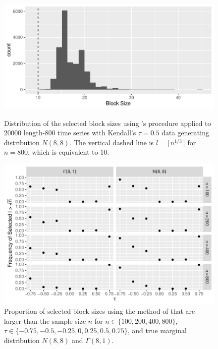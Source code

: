 \documentclass[12pt]{article}
\begin{document}
\begin{figure}[tbp]
  \centering
  \includegraphics[scale=1]{figures/block_dist}
  \caption{Distribution of the selected block sizes using
  \citet{politis2004automatic}'s procedure applied to 20000 length-800 time 
  series with
    Kendall's $\tau = 0.5$ data generating distribution $N(8,8)$. The vertical
    dashed line is $l = \lceil n^{1/3} \rceil$ for $n = 800$, which is equivalent 
    to 10.
  }
  \label{fig:block_dist}


  \centering
  \includegraphics[scale=1]{figures/large_block}
  \caption{Proportion of selected block sizes using the method of
  \citet{politis2004automatic} that are larger than the sample size
    $n$ for $n \in \{100, 200, 400, 800\}$,
    $\tau \in \{-0.75, -0.5, -0.25, 0, 0.25, 0.5, 0.75\}$, and true marginal distribution
    $N(8,8)$ and $\Gamma(8,1)$.
  }
  \label{fig:large_block}
\end{figure}
\end{document}
